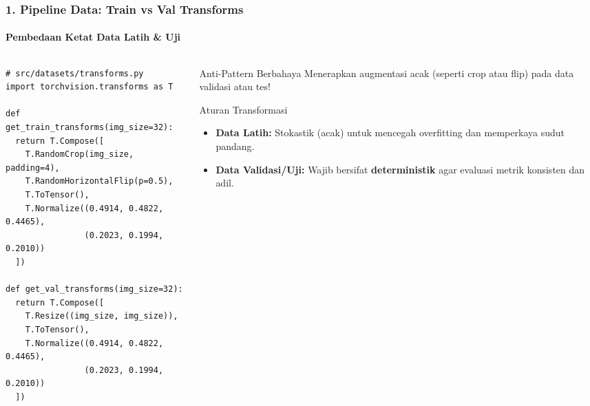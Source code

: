 \documentclass[t,aspectratio=169,xcolor=dvipsnames]{beamer}
\begin{document}
\begin{frame}[fragile]
  \frametitle{1. Pipeline Data: Train vs Val Transforms}
  \framesubtitle{Pembedaan Ketat Data Latih \& Uji}

  \begin{columns}[t]
    \begin{column}{0.50\textwidth}
\begin{lstlisting}[style=py]
# src/datasets/transforms.py
import torchvision.transforms as T

def get_train_transforms(img_size=32):
  return T.Compose([
    T.RandomCrop(img_size, padding=4),
    T.RandomHorizontalFlip(p=0.5),
    T.ToTensor(),
    T.Normalize((0.4914, 0.4822, 0.4465),
                (0.2023, 0.1994, 0.2010))
  ])

def get_val_transforms(img_size=32):
  return T.Compose([
    T.Resize((img_size, img_size)),
    T.ToTensor(),
    T.Normalize((0.4914, 0.4822, 0.4465),
                (0.2023, 0.1994, 0.2010))
  ])
\end{lstlisting}
    \end{column}

    \begin{column}{0.48\textwidth}
      \begin{alertblock}{Anti-Pattern Berbahaya}
        \small
        Menerapkan augmentasi acak (seperti crop atau flip) pada data validasi atau tes!
      \end{alertblock}

      \begin{exampleblock}{Aturan Transformasi}
        \small
        \begin{itemize}\setlength{\itemsep}{2pt}
          \item \textbf{Data Latih:} Stokastik (acak) untuk mencegah overfitting dan memperkaya sudut pandang.
          \item \textbf{Data Validasi/Uji:} Wajib bersifat \textbf{deterministik} agar evaluasi metrik konsisten dan adil.
        \end{itemize}
      \end{exampleblock}
    \end{column}
  \end{columns}
\end{frame}
\end{document}
